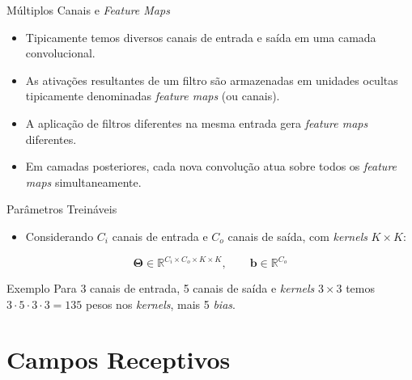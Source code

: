 \documentclass[aspectratio=169,xcolor=dvipsnames]{beamer}
\begin{document}
\begin{frame}{Múltiplos Canais e \textit{Feature Maps}}
\begin{itemize}
    \item Tipicamente temos diversos canais de entrada e saída em uma camada convolucional.
    \item As ativações resultantes de um filtro são armazenadas em unidades ocultas tipicamente denominadas \textit{feature maps} (ou canais).
    \item A aplicação de filtros diferentes na mesma entrada gera \textit{feature maps} diferentes.
    \item Em camadas posteriores, cada nova convolução atua sobre todos os \textit{feature maps} simultaneamente.
\end{itemize}
\end{frame}

\begin{frame}{Parâmetros Treináveis}
\begin{itemize}
    \item Considerando $C_i$ canais de entrada e $C_o$ canais de saída, com \textit{kernels} $K\times K$:
\end{itemize}
\begin{equation*}
    \mathbf{\Theta} \in \mathbb{R}^{C_i \times C_o \times K \times K}, \qquad \mathbf{b} \in \mathbb{R}^{C_o}
\end{equation*}
\begin{block}{Exemplo}
Para 3 canais de entrada, 5 canais de saída e \textit{kernels} $3\times 3$ temos $3 \cdot 5 \cdot 3 \cdot 3 = 135$ pesos nos \textit{kernels}, mais 5 \textit{bias}.
\end{block}
\end{frame}

\section{Campos Receptivos}
\end{document}

